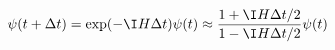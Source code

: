 
\begin{equation}
\psi(t + \Delta t) = \exp(-\I H\Delta t)\psi(t) \approx \frac{1 + \I H\Delta t/2}{1 - \I H\Delta t/2} \psi(t)
\end{equation}

\begin{equation}

\end{equation}

\\\\\\\\\\\\\\\\\\\\\\\\\\\\\\\\\\\\\\\\\\\\\\\\\\\\\\\\